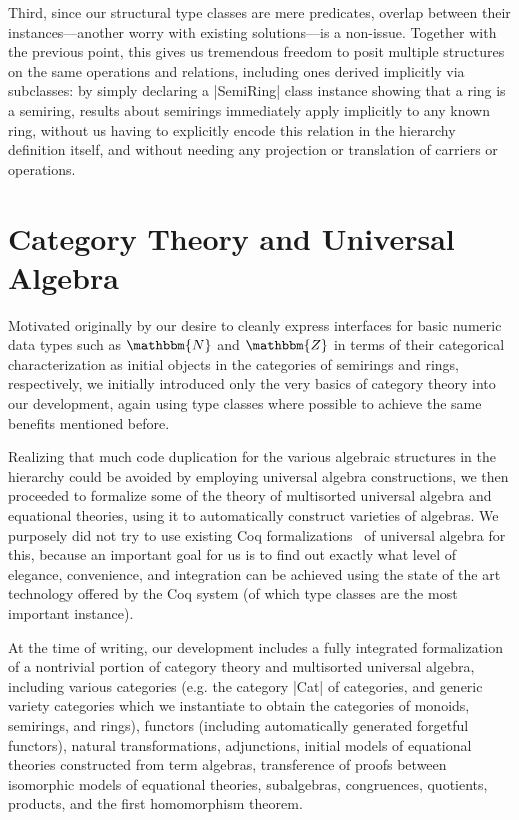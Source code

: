 \documentclass{llncs}
\newcommand{\N}{\ensuremath{\mathbbm{N}}}
\newcommand{\Z}{\ensuremath{\mathbbm{Z}}}
\begin{document}
Third, since our structural type classes are mere predicates, overlap between their instances---another worry with existing solutions---is a non-issue. Together with the previous point, this gives us tremendous freedom to posit multiple structures on the same operations and relations, including ones derived implicitly via subclasses: by simply declaring a |SemiRing| class instance showing that a ring is a semiring, results about semirings immediately apply implicitly to any known ring, without us having to explicitly encode this relation in the hierarchy definition itself, and without needing any projection or translation of carriers or operations.

\section{Category Theory and Universal Algebra}\label{interfaces}\label{modul}

Motivated originally by our desire to cleanly express interfaces for basic numeric data types such as $\N$ and $\Z$ in terms of their categorical characterization as initial objects in the categories of semirings and rings, respectively, we initially introduced only the very basics of category theory into our development, again using type classes where possible to achieve the same benefits mentioned before.

Realizing that much code duplication for the various algebraic structures in the hierarchy could be avoided by employing universal algebra constructions, we then proceeded to formalize some of the theory of multisorted universal algebra and equational theories, using it to automatically construct varieties of algebras. We purposely did not try to use existing Coq formalizations~\cite{DBLP:conf/tphol/Capretta99,dominguez2008formalizing} of universal algebra for this, because an important goal for us is to find out exactly what level of elegance, convenience, and integration can be achieved using the state of the art technology offered by the Coq system (of which type classes are the most important instance).

At the time of writing, our development includes a fully integrated formalization of a nontrivial portion of category theory and multisorted universal algebra, including various categories (e.g. the category |Cat| of categories, and generic variety categories which we instantiate to obtain the categories of monoids, semirings, and rings), functors (including automatically generated forgetful functors), natural transformations, adjunctions, initial models of equational theories constructed from term algebras, transference of proofs between isomorphic models of equational theories, subalgebras, congruences, quotients, products, and the first homomorphism theorem.
\end{document}
